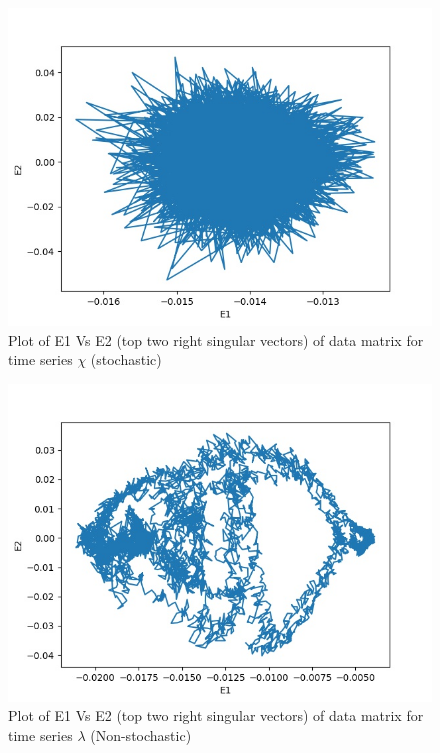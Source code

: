 \documentclass[10pt,conference]{IEEEtran}
\begin{document}
\begin{figure}[ht]
  \centering
  \includegraphics[width=\linewidth]{chi_svd.jpg}
  \caption{Plot of E1 Vs E2 (top two right singular vectors) of data matrix for  time series $\chi$ (stochastic)}
  \label{chi_svd}
\end{figure}

\begin{figure}[ht]
  \centering
  \includegraphics[width=\linewidth]{lamda_svd.jpg}
  \caption{Plot of E1 Vs E2 (top two right singular vectors) of data matrix for  time series $\lambda$ (Non-stochastic)}
  \label{lamda_svd}
\end{figure}
\end{document}
